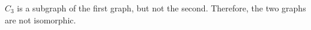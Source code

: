 \label{ch2ex:23}
$C_{3}$ is a subgraph of the first graph, but not the second. Therefore, the two
graphs are not isomorphic.
